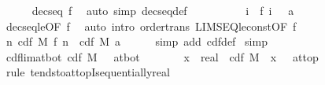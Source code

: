\documentclass[leqno]{article}
\theoremstyle{definition}
\begin{document}
\begin{isabellebody}
\ \ \ \ \isamarkupfalse%
\ {\isacharbackquoteopen}decseq\ f{\isacharbackquoteclose}\ \isamarkupfalse%
\ {\isacharparenleft}auto\ simp{\isacharcolon}\ decseq{\isacharunderscore}def{\isacharparenright}\isanewline
\ \ \ \ \isamarkupfalse%
\isanewline
\ \ \isamarkupfalse%
\ \isamarkupfalse%
\ {\isachardoublequoteopen}{\isacharparenleft}{\isasymInter}i{\isachardot}\ {\isacharbraceleft}{\isachardot}{\isachardot}\ f\ i{\isacharbraceright}{\isacharparenright}\ {\isacharequal}\ {\isacharbraceleft}{\isachardot}{\isachardot}\ a{\isacharbraceright}{\isachardoublequoteclose}\isanewline
\ \ \ \ \isamarkupfalse%
\ decseq{\isacharunderscore}le{\isacharbrackleft}OF\ f{\isacharbrackright}\ \isamarkupfalse%
\ {\isacharparenleft}auto\ intro{\isacharcolon}\ order{\isacharunderscore}trans\ LIMSEQ{\isacharunderscore}le{\isacharunderscore}const{\isacharbrackleft}OF\ f{\isacharparenleft}{}{\isacharparenright}{\isacharbrackright}{\isacharparenright}\isanewline
\ \ \isamarkupfalse%
\ \isamarkupfalse%
\ {\isachardoublequoteopen}{\isacharparenleft}{\isasymlambda}n{\isachardot}\ cdf\ M\ {\isacharparenleft}f\ n{\isacharparenright}{\isacharparenright}\ {\isacharminus}{\isacharminus}{\isacharminus}{\isacharminus}{\isachargreater}\ cdf\ M\ a{\isachardoublequoteclose}\isanewline
\ \ \ \ \isamarkupfalse%
\ {\isacharparenleft}simp\ add{\isacharcolon}\ cdf{\isacharunderscore}def{\isacharparenright}\isanewline
{}\isamarkupfalse%
\ simp%
\isanewline\isanewline%
\isamarkupfalse%
\ cdf{\isacharunderscore}lim{\isacharunderscore}at{\isacharunderscore}bot{\isacharcolon}\ {\isachardoublequoteopen}{\isacharparenleft}cdf\ M\ {\isacharminus}{\isacharminus}{\isacharminus}{\isachargreater}\ {}{\isacharparenright}\ at{\isacharunderscore}bot{\isachardoublequoteclose}\isanewline
{}\isamarkupfalse%
\ {\isacharminus}\ \isanewline
\ \ \isamarkupfalse%
\ {}{\isacharcolon}\ {\isachardoublequoteopen}{\isacharparenleft}{\isacharparenleft}{\isacharpercent}x\ {\isacharcolon}{\isacharcolon}\ real{\isachardot}\ {\isacharminus}\ cdf\ M\ {\isacharparenleft}{\isacharminus}\ x{\isacharparenright}{\isacharparenright}\ {\isacharminus}{\isacharminus}{\isacharminus}{\isachargreater}\ {}{\isacharparenright}\ at{\isacharunderscore}top{\isachardoublequoteclose}\isanewline
\ \ \ \ \isamarkupfalse%
\ {\isacharparenleft}rule\ tendsto{\isacharunderscore}at{\isacharunderscore}topI{\isacharunderscore}sequentially{\isacharunderscore}real{\isacharparenright}\isanewline

\end{isabellebody}
\end{document}
